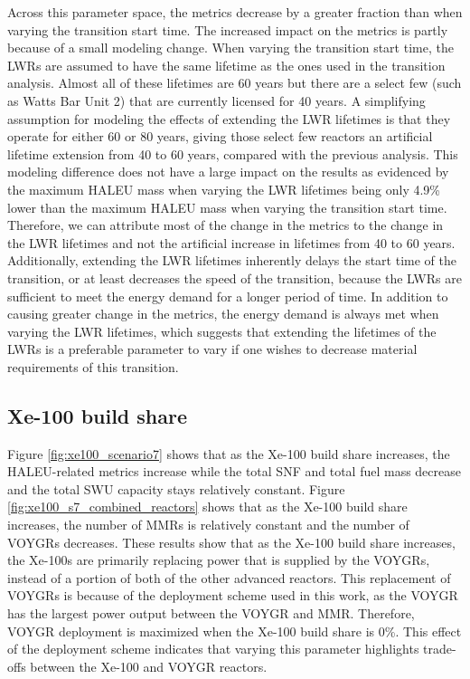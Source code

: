 Across this parameter space, the metrics decrease by a greater fraction than 
when varying the transition start time. The increased impact on the metrics 
is partly because of a small modeling change. When varying the transition 
start time, the \glspl{LWR} are assumed to have the same lifetime as the 
ones used in the transition analysis. Almost all of these lifetimes are  
60 years but there are a select few (such as Watts Bar Unit 2) that 
are currently licensed for 40 years. A simplifying assumption for 
modeling the effects of extending the \gls{LWR} lifetimes is that 
they operate for either 60 or 80 years, giving those select few reactors 
an artificial lifetime extension from 40 to 60 years, compared with the previous analysis. 
This modeling difference does not have a large impact on the results as 
evidenced by the maximum \gls{HALEU} mass when varying the \gls{LWR} lifetimes 
being only 4.9\% lower than the maximum \gls{HALEU} mass when varying the 
transition start time. Therefore, we can attribute most of the change in
the metrics to the 
change in the \gls{LWR} lifetimes and not the artificial increase in 
lifetimes from 40 to 60 years. Additionally, extending the \gls{LWR}
lifetimes inherently delays the start time of the transition, or at 
least decreases the speed of the transition, because the \glspl{LWR} 
are sufficient to meet the energy demand for a longer period of time.
In addition to causing greater change in the metrics, the energy demand 
is always met when varying the \gls{LWR} lifetimes, which suggests that 
extending the lifetimes of the \glspl{LWR} is a preferable parameter to vary 
if one wishes to decrease material requirements of this transition. 

\subsection{Xe-100 build share}
Figure \ref{fig:xe100_scenario7} shows that as the Xe-100 build share increases, 
the \gls{HALEU}-related metrics 
increase while the total \gls{SNF} and total fuel mass decrease and the 
total \gls{SWU} capacity stays relatively constant. Figure \ref{fig:xe100_s7_combined_reactors} 
shows that as the Xe-100 build share 
increases, the number of \glspl{MMR} is relatively constant and the number of 
VOYGRs decreases. These results show that as the Xe-100 build share 
increases, the Xe-100s are primarily replacing power that is supplied by 
the VOYGRs, instead of a portion of both of the other advanced reactors.
This replacement of VOYGRs is because of the deployment scheme used in this
work, as the VOYGR has the largest power output between the VOYGR and 
\gls{MMR}. Therefore, VOYGR deployment is maximized when the Xe-100 
build share is 0\%. This effect of the deployment scheme indicates that 
varying this parameter highlights trade-offs between the Xe-100 and 
VOYGR reactors.

